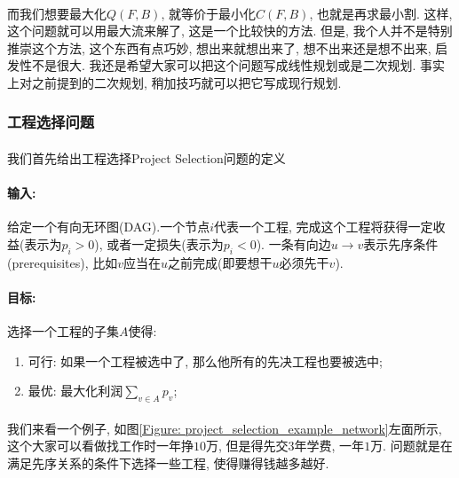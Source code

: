 \documentclass[a4paper]{article}
\renewcommand{\figurename}{图}
\begin{document}
        \paragraph{}而我们想要最大化$Q(F,B)$, 就等价于最小化$C(F,B)$, 也就是再求最小割. 这样, 这个问题就可以用最大流来解了, 这是一个比较快的方法. 但是, 我个人并不是特别推崇这个方法, 这个东西有点巧妙, 想出来就想出来了, 想不出来还是想不出来, 启发性不是很大. 我还是希望大家可以把这个问题写成线性规划或是二次规划. 事实上对之前提到的二次规划, 稍加技巧就可以把它写成现行规划.

        \subsubsection{工程选择问题}
            \paragraph{}我们首先给出工程选择{\sc Project Selection}问题的定义
            \paragraph{输入:}给定一个有向无环图(DAG).一个节点$i$代表一个工程, 完成这个工程将获得一定收益(表示为$p_i > 0$), 或者一定损失(表示为$p_i < 0$). 一条有向边$u \rightarrow v$表示先序条件(prerequisites), 比如$v$应当在$u$之前完成(即要想干$u$必须先干$v$). 
\paragraph{目标:}选择一个工程的子集$A$使得:
 \begin{enumerate}
    \item 可行: 如果一个工程被选中了, 那么他所有的先决工程也要被选中;
    \item 最优: 最大化利润$\sum_{ v \in A} p_v$;
\end{enumerate}

            \paragraph{}我们来看一个例子, 如\figurename\ref{Figure: project_selection_example_network}左面所示, 这个大家可以看做找工作时一年挣$10$万, 但是得先交$3$年学费, 一年$1$万. 问题就是在满足先序关系的条件下选择一些工程, 使得赚得钱越多越好.
\end{document}
